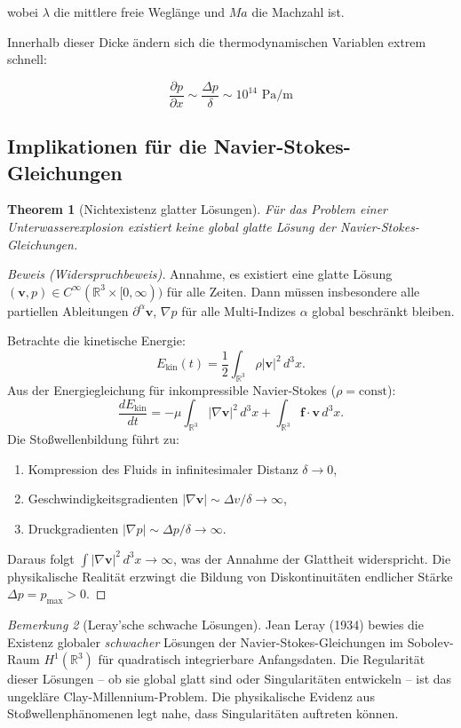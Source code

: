 ﻿\documentclass[12pt,a4paper]{article}
\newtheorem{theorem}{Theorem}[section]
\theoremstyle{definition}
\theoremstyle{remark}
\newtheorem{remark}[theorem]{Bemerkung}
\begin{document}
wobei $\lambda$ die mittlere freie Weglänge und $Ma$ die Machzahl ist.

Innerhalb dieser Dicke ändern sich die thermodynamischen Variablen extrem schnell:

\begin{equation}
\frac{\partial p}{\partial x} \sim \frac{\Delta p}{\delta} \sim 10^{14} \text{ Pa/m}
\end{equation}

\subsection{Implikationen für die Navier-Stokes-Gleichungen}

\begin{theorem}[Nichtexistenz glatter Lösungen]
Für das Problem einer Unterwasserexplosion existiert keine global glatte Lösung der Navier-Stokes-Gleichungen.
\end{theorem}

\begin{proof}[Beweis (Widerspruchbeweis)]
Annahme, es existiert eine glatte Lösung $(\mathbf{v}, p) \in C^\infty(\mathbb{R}^3 \times [0,\infty))$ für alle Zeiten. Dann müssen insbesondere alle partiellen Ableitungen $\partial^\alpha \mathbf{v}$, $\nabla p$ für alle Multi-Indizes $\alpha$ global beschränkt bleiben.

Betrachte die kinetische Energie:
\[
E_{\text{kin}}(t) = \frac{1}{2}\int_{\mathbb{R}^3} \rho |\mathbf{v}|^2\,d^3x.
\]
Aus der Energiegleichung für inkompressible Navier-Stokes ($\rho = \text{const}$):
\[
\frac{dE_{\text{kin}}}{dt} = -\mu\int_{\mathbb{R}^3}|\nabla\mathbf{v}|^2\,d^3x + \int_{\mathbb{R}^3}\mathbf{f}\cdot\mathbf{v}\,d^3x.
\]
Die Stoßwellenbildung führt zu:
\begin{enumerate}
\item Kompression des Fluids in infinitesimaler Distanz $\delta \to 0$,
\item Geschwindigkeitsgradienten $|\nabla\mathbf{v}| \sim \Delta v/\delta \to \infty$,
\item Druckgradienten $|\nabla p| \sim \Delta p/\delta \to \infty$.
\end{enumerate}
Daraus folgt $\int |\nabla\mathbf{v}|^2\,d^3x \to \infty$, was der Annahme der Glattheit widerspricht. Die physikalische Realität erzwingt die Bildung von Diskontinuitäten endlicher Stärke $\Delta p = p_{\text{max}} > 0$. 
\end{proof}

\begin{remark}[Leray'sche schwache Lösungen]
Jean Leray (1934) bewies die Existenz globaler \emph{schwacher} Lösungen der Navier-Stokes-Gleichungen im Sobolev-Raum $H^1(\mathbb{R}^3)$ für quadratisch integrierbare Anfangsdaten. Die Regularität dieser Lösungen -- ob sie global glatt sind oder Singularitäten entwickeln -- ist das ungekläre Clay-Millennium-Problem. Die physikalische Evidenz aus Stoßwellenphänomenen legt nahe, dass Singularitäten auftreten können.
\end{remark}
\end{document}
